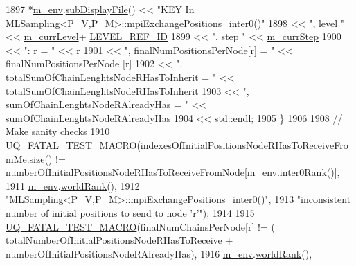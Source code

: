 \begin{DoxyCode}
1897       *\hyperlink{class_q_u_e_s_o_1_1_m_l_sampling_a13f1ca4fe9f94822fe572a743eaced1d}{m\_env}.\hyperlink{class_q_u_e_s_o_1_1_base_environment_a8a0064746ae8dddfece4229b9ad374d6}{subDisplayFile}() << \textcolor{stringliteral}{"KEY In
       MLSampling<P\_V,P\_M>::mpiExchangePositions\_inter0()"}
1898                               << \textcolor{stringliteral}{", level "} << \hyperlink{class_q_u_e_s_o_1_1_m_l_sampling_af9416874c856e50f3b35270e801f17e4}{m\_currLevel}+
      \hyperlink{_m_l_sampling_level_options_8h_a68d15eaf394d210effcf584b938206d3}{LEVEL\_REF\_ID}
1899                               << \textcolor{stringliteral}{", step "}  << \hyperlink{class_q_u_e_s_o_1_1_m_l_sampling_a1b1f8ccb4823bdfa26ec652f0807c63e}{m\_currStep}
1900                               << \textcolor{stringliteral}{": r = "}                                       << r
1901                               << \textcolor{stringliteral}{", finalNumPositionsPerNode[r] = "}             << finalNumPositionsPerNode
      [r]
1902                               << \textcolor{stringliteral}{", totalSumOfChainLenghtsNodeRHasToInherit = "} << 
      totalSumOfChainLenghtsNodeRHasToInherit
1903                               << \textcolor{stringliteral}{", sumOfChainLenghtsNodeRAlreadyHas = "}        << 
      sumOfChainLenghtsNodeRAlreadyHas
1904                               << std::endl;
1905     \}
1906 
1908     \textcolor{comment}{// Make sanity checks}
1910 \textcolor{comment}{}    \hyperlink{_defines_8h_a56d63d18d0a6d45757de47fcc06f574d}{UQ\_FATAL\_TEST\_MACRO}(indexesOfInitialPositionsNodeRHasToReceiveFromMe.size() != 
      numberOfInitialPositionsNodeRHasToReceiveFromNode[\hyperlink{class_q_u_e_s_o_1_1_m_l_sampling_a13f1ca4fe9f94822fe572a743eaced1d}{m\_env}.\hyperlink{class_q_u_e_s_o_1_1_base_environment_ae106b5bb8a80b655b88b3a26b1e7c185}{inter0Rank}()],
1911                         \hyperlink{class_q_u_e_s_o_1_1_m_l_sampling_a13f1ca4fe9f94822fe572a743eaced1d}{m\_env}.\hyperlink{class_q_u_e_s_o_1_1_base_environment_a78b57112bbd0e6dd0e8afec00b40ffa7}{worldRank}(),
1912                         \textcolor{stringliteral}{"MLSampling<P\_V,P\_M>::mpiExchangePositions\_inter0()"},
1913                         \textcolor{stringliteral}{"inconsistent number of initial positions to send to node 'r'"});
1914 
1915     \hyperlink{_defines_8h_a56d63d18d0a6d45757de47fcc06f574d}{UQ\_FATAL\_TEST\_MACRO}(finalNumChainsPerNode[r] != (
      totalNumberOfInitialPositionsNodeRHasToReceive + numberOfInitialPositionsNodeRAlreadyHas),
1916                         \hyperlink{class_q_u_e_s_o_1_1_m_l_sampling_a13f1ca4fe9f94822fe572a743eaced1d}{m\_env}.\hyperlink{class_q_u_e_s_o_1_1_base_environment_a78b57112bbd0e6dd0e8afec00b40ffa7}{worldRank}(),

\end{DoxyCode}
